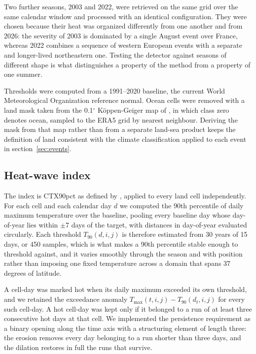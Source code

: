 \documentclass{amsdraft}
\begin{document}
Two further seasons, 2003 and 2022, were retrieved on the same grid over the
same calendar window and processed with an identical configuration. They were
chosen because their heat was organized differently from one another and from
2026: the severity of 2003 is dominated by a single August event over France,
whereas 2022 combines a sequence of western European events with a separate and
longer-lived northeastern one. Testing the detector against seasons of
different shape is what distinguishes a property of the method from a property
of one summer.

Thresholds were computed from a 1991--2020 baseline, the current World
Meteorological Organization reference normal. Ocean cells were removed with a
land mask taken from the 0.1$^\circ$ K\"oppen-Geiger map of \citet{Beck2023},
in which class zero denotes ocean, sampled to the ERA5 grid by nearest
neighbour. Deriving the mask from that map rather than from a separate
land-sea product keeps the definition of land consistent with the climate
classification applied to each event in section~\ref{sec:events}.

\subsection{Heat-wave index}
\label{sec:index}

The index is CTX90pct as defined by \citet{PerkinsAlexander2013}, applied to
every land cell independently. For each cell and each calendar day $d$ we
computed the 90th percentile of daily maximum temperature over the baseline,
pooling every baseline day whose day-of-year lies within $\pm$7 days of the
target, with distances in day-of-year evaluated circularly. Each threshold
$T_{90}(d,i,j)$ is therefore estimated from 30 years of 15 days, or 450
samples, which is what makes a 90th percentile stable enough to threshold
against, and it varies smoothly through the season and with position rather
than imposing one fixed temperature across a domain that spans 37 degrees of
latitude.

A cell-day was marked hot when its daily maximum exceeded its own threshold,
and we retained the exceedance anomaly
$T_{\max}(t,i,j) - T_{90}(d_t,i,j)$ for every such cell-day. A hot cell-day was
kept only if it belonged to a run of at least three consecutive hot days at
that cell. We implemented the persistence requirement as a binary opening
along the time axis with a structuring element of length three: the erosion
removes every day belonging to a run shorter than three days, and the dilation
restores in full the runs that survive.
\end{document}
